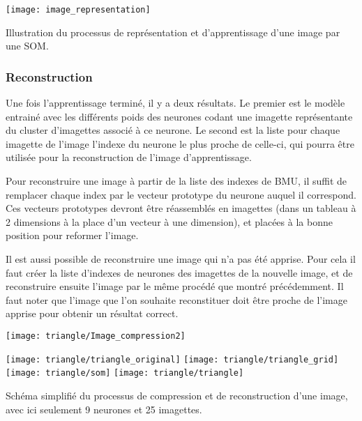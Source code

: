 	\begin{figureth}
		\texttt{[image: image\_representation]}
		\caption[Représentation d'une image]{Illustration du processus de représentation et d'apprentissage d'une image par une SOM.}\label{fig:img:rep}
	\end{figureth}

	\subsubsection{Reconstruction}

	Une fois l'apprentissage terminé, il y a deux résultats. Le premier est le modèle entrainé avec les différents poids des neurones codant une imagette représentante du cluster d'imagettes associé à ce neurone. Le second est la liste pour chaque imagette de l'image l'indexe du neurone le plus proche de celle-ci, qui pourra être utilisée pour la reconstruction de l'image d'apprentissage.  

	Pour reconstruire une image à partir de la liste des indexes de BMU, il suffit de remplacer chaque index par le vecteur prototype du neurone auquel il correspond. Ces vecteurs prototypes devront être réassemblés en imagettes (dans un tableau à 2 dimensions à la place d'un vecteur à une dimension), et placées à la bonne position pour reformer l'image.

	Il est aussi possible de reconstruire une image qui n'a pas été apprise. Pour cela il faut créer la liste d'indexes de neurones des imagettes de la nouvelle image, et de reconstruire ensuite l'image par le même procédé que montré précédemment. Il faut noter que l'image que l'on souhaite reconstituer doit être proche de l'image apprise pour obtenir un résultat correct.

	\begin{figureth}
		\begin{subfigureth}{\textwidth}
			\texttt{[image: triangle/Image\_compression2]}
		\end{subfigureth}
		\begin{subfigureth}{\textwidth}
			\texttt{[image: triangle/triangle\_original]}\hfill
			\texttt{[image: triangle/triangle\_grid]}\hfill
			\texttt{[image: triangle/som]}\hfill
			\texttt{[image: triangle/triangle]}
		\end{subfigureth}
		\caption[Compression et décompression d'image]{Schéma simplifié du processus de compression et de reconstruction d'une image, avec ici seulement 9 neurones et 25 imagettes.}\label{fig:img:comp_ex}
	\end{figureth}

